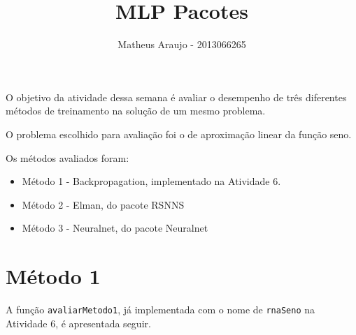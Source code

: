 \documentclass{article}
\begin{document}


\title{MLP Pacotes}
\author{Matheus Araujo - 2013066265}
\date{}

\maketitle

O objetivo da atividade dessa semana é avaliar o desempenho de três diferentes métodos de treinamento na solução de um mesmo problema.

O problema escolhido para avaliação foi o de aproximação linear da função seno.

Os métodos avaliados foram:

\begin{itemize}
  \item Método 1 - Backpropagation, implementado na Atividade 6.
  \item Método 2 - Elman, do pacote RSNNS
  \item Método 3 - Neuralnet, do pacote Neuralnet
\end{itemize}

\section{Método 1}

A função \texttt{avaliarMetodo1}, já implementada com o nome de \texttt{rnaSeno} na Atividade 6, é apresentada seguir.
\end{document}
